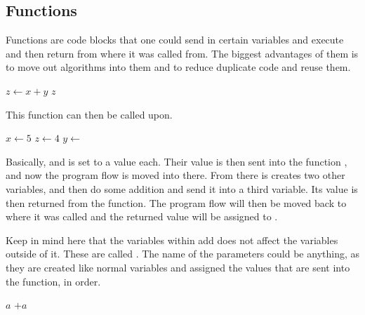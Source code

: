 \subsection{Functions}

Functions are code blocks that one could send in certain variables and execute and then return from where it was called from. The biggest advantages of them is to move out algorithms into them and to reduce duplicate code and reuse them.

\begin{algorithm}[H]
	\begin{algorithmic}[1]
			\State $z \gets x + y$
			\State \Return $z$
		\EndFunction
	\end{algorithmic}
\end{algorithm}

This function can then be called upon.

\begin{algorithm}[H]
	\begin{algorithmic}[1]
		\State $x \gets 5$
		\State $z \gets 4$
		\State $y \gets$ 
	\end{algorithmic}
\end{algorithm}

Basically,  and  is set to a value each. Their value is then sent into the function , and now the program flow is moved into there. From there is creates two other variables, and then do some addition and send it into a third variable. Its value is then returned from the function. The program flow will then be moved back to where it was called and the returned value will be assigned to .

Keep in mind here that the variables within add does not affect the variables outside of it. These are called . The name of the parameters could be anything, as they are created like normal variables and assigned the values that are sent into the function, in order.

\begin{algorithm}[H]
	\begin{algorithmic}[1]
				\State \Return $a$
			\EndIf
			\State \Return {}$ + a$
		\EndFunction
	\end{algorithmic}
\end{algorithm}

